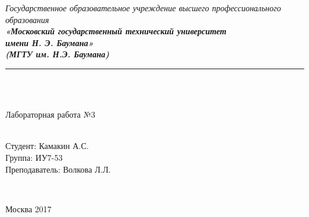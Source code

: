 \documentclass[utf8x, 12pt]{G7-32} %
\begin{document}
\frontmatter %



\begin{center}
	\hfill \break
	\textit{
		\normalsize{Государственное образовательное учреждение высшего профессионального образования}}\\ 
	
	\textit{
		\normalsize  {\bf  «Московский государственный технический университет}\\ 
		\normalsize  {\bf имени Н. Э. Баумана»}\\
		\normalsize  {\bf (МГТУ им. Н.Э. Баумана)}\\
	}
	\noindent\rule{\textwidth}{2pt}
	\hfill \break
	\noindent
	\\
	\noindent
	\\
	\hfill\break
	\hfill \break
	\hfill \break
	\hfill \break
	
	\hfill \break
	\large{Лабораторная работа №3\\ }\\
	\hfill \break
	\hfill \break
	\hfill \break
	\hfill \break
	\hfill \break	
	\normalsize {
		\begin{minipage}[t]{7cm}
		\end{minipage}
		\hfill
		\begin{minipage}[t]{7cm}
			\flushright
			Студент: Камакин А.С.\\
			Группа: ИУ7-53\\
			Преподаватель: Волкова Л.Л.
		\end{minipage}
	}\\
	\hfill \break	
	\hfill \break
	\hfill \break
	\hfill \break
	\hfill \break
\end{center}
\hfill \break
\hfill \break
\begin{center} Москва 2017 \end{center}

\thispagestyle{empty} %

\newpage

\mainmatter %
\end{document}
